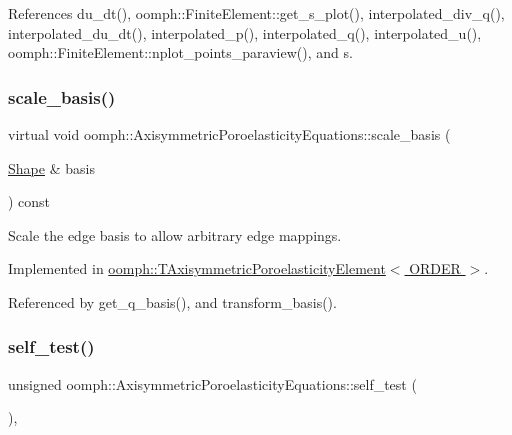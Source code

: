 References du\+\_\+dt(), oomph\+::\+Finite\+Element\+::get\+\_\+s\+\_\+plot(), interpolated\+\_\+div\+\_\+q(), interpolated\+\_\+du\+\_\+dt(), interpolated\+\_\+p(), interpolated\+\_\+q(), interpolated\+\_\+u(), oomph\+::\+Finite\+Element\+::nplot\+\_\+points\+\_\+paraview(), and s.

\mbox{\label{classoomph_1_1AxisymmetricPoroelasticityEquations_a252e63649ec2c65c1d0b8c7f461a11c6}} 
\subsubsection{\texorpdfstring{scale\+\_\+basis()}{scale\_basis()}}
{\footnotesize\ttfamily virtual void oomph\+::\+Axisymmetric\+Poroelasticity\+Equations\+::scale\+\_\+basis (\begin{DoxyParamCaption}\item[{\hyperlink{classoomph_1_1Shape}{Shape} \&}]{basis }\end{DoxyParamCaption}) const\hspace{0.3cm}{\ttfamily [pure virtual]}}



Scale the edge basis to allow arbitrary edge mappings. 



Implemented in \hyperlink{classoomph_1_1TAxisymmetricPoroelasticityElement_ad06425b96b50c62a9e006ca7877cbb95}{oomph\+::\+T\+Axisymmetric\+Poroelasticity\+Element$<$ O\+R\+D\+E\+R $>$}.



Referenced by get\+\_\+q\+\_\+basis(), and transform\+\_\+basis().

\mbox{\label{classoomph_1_1AxisymmetricPoroelasticityEquations_a29c6268b887580ed0fbb65900467869b}} 
\subsubsection{\texorpdfstring{self\+\_\+test()}{self\_test()}}
{\footnotesize\ttfamily unsigned oomph\+::\+Axisymmetric\+Poroelasticity\+Equations\+::self\+\_\+test (\begin{DoxyParamCaption}{ }\end{DoxyParamCaption})\hspace{0.3cm}{\ttfamily [inline]}, {\ttfamily [virtual]}}



